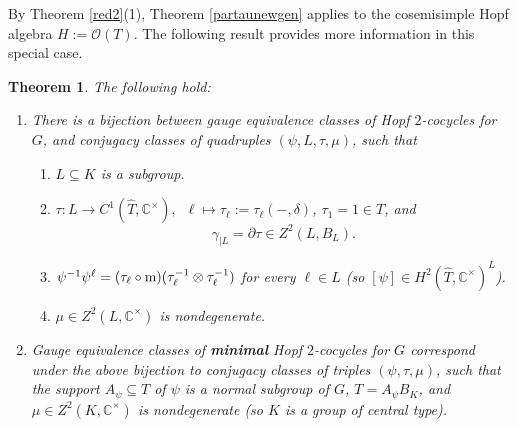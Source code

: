 \documentclass{amsart}
\newtheorem{theorem}{Theorem}[section]
\theoremstyle{definition}
\newcommand{\ot}{\otimes}
\numberwithin{equation}{section}
\begin{document}
By Theorem \ref{red2}(1), Theorem \ref{partaunewgen} applies to the cosemisimple Hopf algebra $H:=\mathscr{O}(T)$. The following result provides more information in this special case.

\begin{theorem}\label{fibredred1}
The following hold:
\begin{enumerate} 
\item
There is a bijection between gauge equivalence classes of Hopf $2$-cocycles for $G$, and conjugacy classes of quadruples $(\psi,L,\tau,\mu)$, such that 
\begin{enumerate}
\item $L\subseteq K$ is a subgroup. 
\item
$\tau: L\to C^1(\widehat{T},\mathbb{C}^{\times}),\,\,\,\ell\mapsto \tau_{\ell}:=\tau_{\ell}(-,\delta)$,
$\tau_{1}=1\in T$, and   
$$\gamma_{\mid L}=\partial\tau\in Z^2(L,B_L).$$ 
\item  
$\psi^{-1}\psi^{\ell}=(\tau_{\ell}\circ {\rm m})(\tau_{\ell}^{-1}\ot \tau_{\ell}^{-1})$ for every $\ell\in L$ (so $[\psi]\in H^2(\widehat{T},\mathbb{C}^{\times})^L$).  
\item 
$\mu\in Z^2(L,\mathbb{C}^{\times})$ is nondegenerate.
\end{enumerate} 
\item
Gauge equivalence classes of {\bf minimal} Hopf $2$-cocycles for $G$ correspond under the above bijection to conjugacy classes of triples $(\psi,\tau,\mu)$, such that the support $A_{\psi}\subseteq T$ of $\psi$ is a normal subgroup of  $G$, $T=A_{\psi}B_K$, and $\mu\in Z^2(K,\mathbb{C}^{\times})$ is nondegenerate (so $K$ is a group of central type).
\end{enumerate}
\end{theorem}
\end{document}
